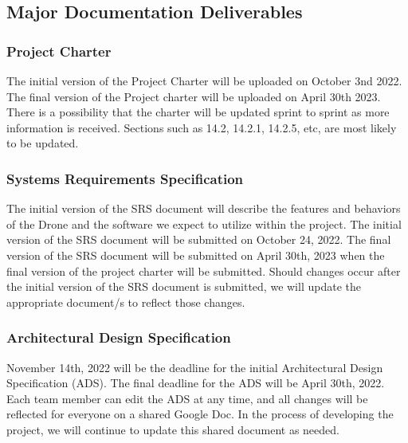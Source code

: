 
\subsection{Major Documentation Deliverables}

\subsubsection{Project Charter}
The initial version of the Project Charter will be uploaded on October 3nd 2022. The final version of the Project charter will be uploaded on April 30th 2023. There is a possibility that the charter will be updated sprint to sprint as more information is received. Sections such as 14.2, 14.2.1, 14.2.5, etc, are most likely to be updated.

\subsubsection{Systems Requirements Specification}
The initial version of the SRS document will describe the features and behaviors of the Drone and the software we expect to utilize within the project. The initial version of the SRS document will be submitted on October 24, 2022. The final version of the SRS document will be submitted on April 30th, 2023 when the final version of the project charter will be submitted. Should changes occur after the initial version of the SRS document is submitted, we will update the appropriate document/s to reflect those changes.

\subsubsection{Architectural Design Specification}
November 14th, 2022 will be the deadline for the initial Architectural Design Specification (ADS). The final deadline for the ADS will be April 30th, 2022. Each team member can edit the ADS at any time, and all changes will be reflected for everyone on a shared Google Doc. In the process of developing the project, we will continue to update this shared document as needed.

